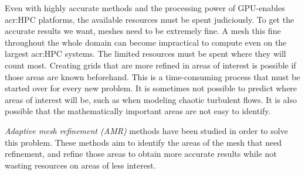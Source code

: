 Even with highly accurate methods and the processing power of GPU-enables \acrshort{acr:HPC}
platforms, the available resources must be spent judiciously. To get the accurate results we want,
meshes need to be extremely fine. A mesh this fine throughout the whole domain can become
impractical to compute even on the largest \acrshort{acr:HPC} systems. The limited resources must be
spent where they will count most. Creating grids that are more refined in areas of interest is
possible if those areas are known beforehand. This is a time-consuming process that must be started
over for every new problem. It is sometimes not possible to predict where areas of interest will be,
such as when modeling chaotic turbulent flows. It is also possible that the mathematically important
areas are not easy to identify. 

\textit{Adaptive mesh refinement (AMR)} methods have been studied in order to solve this problem.
These methods aim to identify the areas of the mesh that need refinement, and refine those areas to
obtain more accurate results while not wasting resources on areas of less interest.
~\cite{Berger1984}


